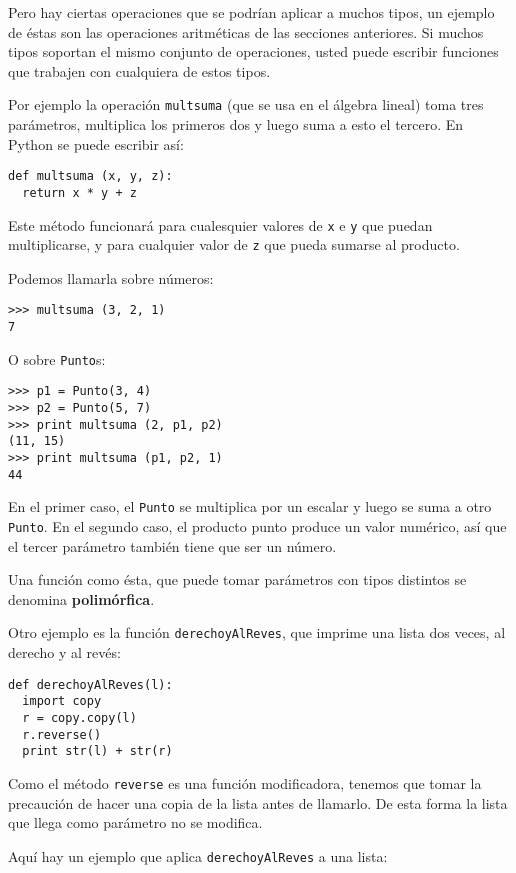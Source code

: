 Pero hay ciertas operaciones que se podrían aplicar a muchos
tipos, un ejemplo de éstas son las operaciones aritméticas de 
las secciones anteriores. Si muchos tipos soportan el mismo
conjunto de operaciones, usted puede escribir funciones que
trabajen con cualquiera de estos tipos.

Por ejemplo la operación  \texttt{multsuma} (que se usa en 
el álgebra lineal) toma tres parámetros, multiplica los
primeros dos y luego suma a esto el tercero. En Python 
se puede escribir así:

\beforeverb
\begin{verbatim}
def multsuma (x, y, z):
  return x * y + z
\end{verbatim}
\afterverb
%
Este método funcionará para cualesquier valores de \texttt{x} e \texttt{y}
que puedan multiplicarse, y para cualquier valor de \texttt{z} que pueda
sumarse al producto.

Podemos llamarla sobre números:

\beforeverb
\begin{verbatim}
>>> multsuma (3, 2, 1)
7
\end{verbatim}
\afterverb
%
O sobre  \texttt{Punto}s:

\beforeverb
\begin{verbatim}
>>> p1 = Punto(3, 4)
>>> p2 = Punto(5, 7)
>>> print multsuma (2, p1, p2)
(11, 15)
>>> print multsuma (p1, p2, 1)
44
\end{verbatim}
\afterverb
%
En el primer caso, el  \texttt{Punto} se multiplica por un escalar
y luego se suma a otro  \texttt{Punto}. En el segundo caso, el 
producto punto produce un valor numérico, así que el tercer
parámetro también tiene que ser un número.

Una función como ésta, que puede tomar parámetros con tipos 
distintos se denomina {\bf polimórfica}.

Otro ejemplo es la función \texttt{derechoyAlReves},
que imprime una lista dos veces, al derecho y al revés:

\beforeverb
\begin{verbatim}
def derechoyAlReves(l):
  import copy
  r = copy.copy(l)
  r.reverse()
  print str(l) + str(r)
\end{verbatim}
\afterverb
%
Como  el método \texttt{reverse} es una función modificadora, tenemos
que tomar la precaución de hacer una copia de la lista antes de 
llamarlo. De esta forma la lista que llega como parámetro no 
se modifica.

Aquí hay un ejemplo que aplica \texttt{derechoyAlReves} a una lista:

